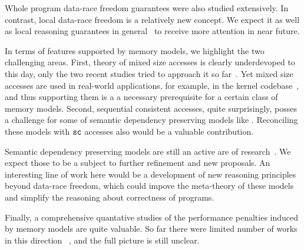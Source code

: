 Whole program data-race freedom guarantees were also studied extensively.
In contrast, local data-race freedom is a relatively new concept. 
We expect it as well as local reasoning guarantees 
in general~\cite{Dodds-al:ESOP18, Jagadeesan-al:OOPSLA2020, Cho-al:PLDI21} 
to receive more attention in near future.  

In terms of features supported by memory models, 
we highlight the two challenging areas.
First, theory of mixed size accesses is clearly 
underdevoped to this day, only the two recent studies 
tried to approach it so far~\cite{Flur-al:POPL17, Watt-al:PLDI2020}.
Yet mixed size accesses are used in real-world applications,
for example, in the \Linux kernel codebase~\cite{Flur-al:POPL17},
and thus supporting them is a a necessary prerequisite 
for a certain class of memory models. 
Second, sequential consistent accesses, quite surprisingly,
posses a challenge for some of semantic dependency preserving
models like \Promising. Reconciling these models with ${\mathtt{sc}}$ 
accesses also would be a valuable contribution.

Semantic dependency preserving models are still an active 
are of research~\cite{Kang-al:POPL17, Lee-al:PLDI20, Cho-al:PLDI21,
Chakraborty-Vafeiadis:POPL19, Paviotti-al:ESOP20, 
Jagadeesan-al:OOPSLA2020}. 
We expect those to be a subject to 
further refinement and new proposals. 
An interesting line of work here would be 
a development of new reasoning principles
beyond data-race freedom, which could 
impove the meta-theory of these models and 
simplify the reasoning about correctness of programs.   

Finally, a comprehensive quantative studies 
of the performance penalties induced by memory models are quite valuable.
So far there were limited number of works in this direction~%
\cite{Singh-al:ISCA12, Liu-al:OOPSLA17, Liu-al:PLDI19, 
Vollmer-al:PPoPP17, Dolan-al:PLDI18, Ou-Demsky:OOPSLA18}, 
and the full picture is still unclear. 

